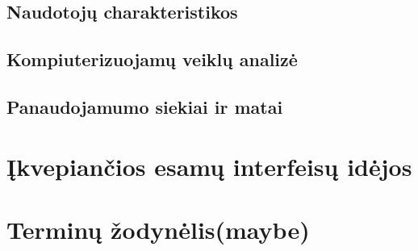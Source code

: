 \documentclass{VUMIFPSkursinis}
\begin{document}
  \subsection{Naudotojų charakteristikos}
  \subsection{Kompiuterizuojamų veiklų analizė}
  \subsection{Panaudojamumo siekiai ir matai}
\section{Įkvepiančios esamų interfeisų idėjos}
\section{Terminų žodynėlis(maybe)}
\end{document}
